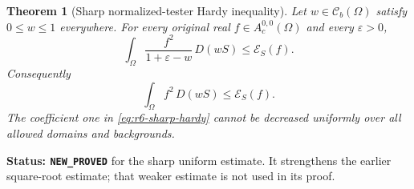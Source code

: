 \documentclass[11pt,a4paper]{article}
\numberwithin{equation}{section}
\newtheorem{theorem}{Theorem}[section]
\theoremstyle{definition}
\theoremstyle{remark}
\begin{document}
\begin{theorem}[Sharp normalized-tester Hardy inequality]
\label{thm:r6-sharp-relative-hardy}
Let $w\in\mathcal C_b(\Omega)$ satisfy $0\le w\le1$ everywhere.
For every original real $f\in A_c^{0,0}(\Omega)$ and every
$\varepsilon>0$,
\begin{equation}
 \int_\Omega\frac{f^2}{1+\varepsilon-w}\,D(wS)
                                      \le\mathcal E_S(f).
 \label{eq:r6-relative-picone}
\end{equation}
Consequently
\begin{equation}
                       \int_\Omega f^2\,D(wS)
                                      \le\mathcal E_S(f).
 \label{eq:r6-sharp-hardy}
\end{equation}
The coefficient one in \eqref{eq:r6-sharp-hardy} cannot be decreased
uniformly over all allowed domains and backgrounds.
\end{theorem}

\noindent\textbf{Status: \texttt{NEW\_PROVED}} for the sharp uniform
estimate. It strengthens the earlier square-root estimate; that weaker
estimate is not used in its proof.
\end{document}
